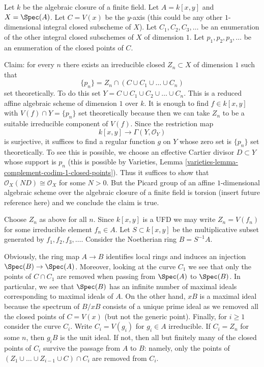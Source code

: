 \noindent
Let $k$ be the algebraic closure of a finite field.
Let $A = k[x, y]$ and $X = \Spec(A)$.
Let $C = V(x)$ be the $y$-axis (this could be any other
$1$-dimensional integral closed subscheme of $X$).
Let $C_1, C_2, C_3, \ldots$ be an enumeration
of the other integral closed subschemes of $X$ of dimension $1$.
Let $p_1, p_2, p_3, \ldots$ be an
enumeration of the closed points of $C$.

\medskip\noindent
Claim: for every $n$ there exists an irreducible closed
$Z_n \subset X$ of dimension $1$ such that
$$
\{p_n\} = Z_n \cap (C \cup C_1 \cup \ldots \cup C_n)
$$
set theoretically. To do this set
$Y = C \cup C_1 \cup C_2 \cup \ldots \cup C_n$.
This is a reduced affine algebraic scheme of dimension $1$ over $k$.
It is enough to find $f \in k[x, y]$ with $V(f) \cap  Y = \{p_n\}$
set theoretically because then we can take $Z_n$ to be a suitable
irreducible component of $V(f)$. Since the restriction map
$$
k[x, y] \longrightarrow \Gamma(Y, \mathcal{O}_Y)
$$
is surjective, it suffices to find a regular function $g$ on $Y$
whose zero set is $\{p_n\}$ set theoretically.
To see this is possible, we choose an effective Cartier divisor
$D \subset Y$ whose support is $p_n$ (this is possible by
Varieties, Lemma \ref{varieties-lemma-complement-codim-1-closed-points}).
Thus it suffices to show that $\mathcal{O}_X(ND) \cong \mathcal{O}_X$
for some $N > 0$. But the Picard group of an affine $1$-dimensional
algebraic scheme over the algebraic closure of a finite field is torsion
(insert future reference here) and we conclude the claim is true.

\medskip\noindent
Choose $Z_n$ as above for all $n$. Since $k[x, y]$ is a UFD
we may write $Z_n = V(f_n)$ for some irreducible element $f_n \in A$.
Let $S \subset k[x, y]$ be the multiplicative subset generated
by $f_1, f_2, f_3, \ldots$. Consider the Noetherian ring $B = S^{-1}A$.

\medskip\noindent
Obviously, the ring map $A \to B$ identifies local rings
and induces an injection $\Spec(B) \to \Spec(A)$.
Moreover, looking at the curve $C_1$ we see that
only the points of $C \cap C_1$ are removed when passing
from $\Spec(A)$ to $\Spec(B)$.
In particular, we see that $\Spec(B)$ has an infinite
number of maximal ideals corresponding to maximal
ideals of $A$. On the other hand, $xB$ is a maximal ideal because
the spectrum of $B/xB$ consists of a unique prime ideal
as we removed all the closed points of $C = V(x)$ (but not
the generic point).
Finally, for $i \geq 1$ consider the curve $C_i$.
Write $C_i = V(g_i)$ for $g_i \in A$ irreducible.
If $C_i = Z_n$ for some $n$, then $g_iB$ is the unit ideal.
If not, then all but finitely many of the closed points
of $C_i$ survive the passage from $A$ to $B$:
namely, only the points of
$(Z_1 \cup \ldots \cup Z_{i - 1} \cup C) \cap C_i$
are removed from $C_i$.

